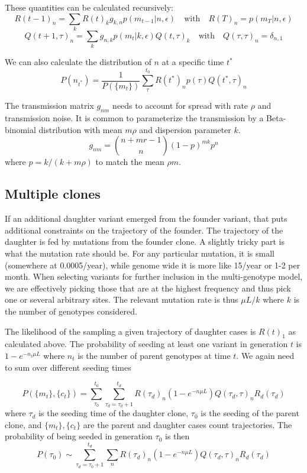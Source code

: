\documentclass[aps,rmp, onecolumn]{revtex4}
\begin{document}
These quantities can be calculated recursively:
\begin{equation}
    R(t-1)_n = \sum_k R(t)_k g_{k,n} p(m_{t-1}|n,\epsilon) \quad \mathrm{with} \quad R(T)_n = p(m_{T}|n,\epsilon)
\end{equation}
\begin{equation}
    Q(t+1,\tau)_n = \sum_k g_{n,k} p(m_t|k,\epsilon) Q(t,\tau)_k  \quad \mathrm{with} \quad Q(\tau,\tau)_n = \delta_{n,1}
\end{equation}


We can also calculate the distribution of $n$ at a specific time $t^*$
\begin{equation}
    P(n_{t^*}) = \frac{1}{P(\{m_t\})}\sum_{\tau}^{t_0} R(t^*)_n p(\tau) Q(t^*,\tau)_n
\end{equation}


The transmission matrix $g_{nm}$ needs to account for spread with rate $\rho$ and transmission noise.
It is common to parameterize the transmission by a Beta-binomial distribution with mean $m\rho$ and dispersion parameter $k$.
\begin{equation}
    g_{nm} = {n + mr - 1 \choose n} (1-p)^{m k} p^n
\end{equation}
where $p=k/(k+m\rho)$ to match the mean $\rho m$.


\subsection*{Multiple clones}
If an additional daughter variant emerged from the founder variant, that puts additional constraints on the trajectory of the founder.
The trajectory of the daughter is fed by mutations from the founder clone.
A slightly tricky part is what the mutation rate should be.
For any particular mutation, it is small (somewhere at 0.0005/year), while genome wide it is more like 15/year or 1-2 per month.
When selecting variants for further inclusion in the multi-genotype model, we are effectively picking those that are at the highest frequency and thus pick one or several arbitrary sites.
The relevant mutation rate is thus $\mu L/k$ where $k$ is the number of genotypes considered.

The likelihood of the sampling a given trajectory of daughter cases is $R(t)_1$ as calculated above.
The probability of seeding at least one variant in generation $t$ is $1-e^{-n_t\mu L}$ where $n_t$ is the number of parent genotypes at time $t$.
We again need to sum over different seeding times

\begin{equation}
    P(\{m_t\}, \{c_t\}) = \sum_{\tau_0}^{t_0}\sum_{\tau_d=\tau_0+1}^{t_d} R(\tau_d)_n (1-e^{-n\mu L}) Q(\tau_d,\tau)_n R_d(\tau_d)
\end{equation}
where $\tau_d$ is the seeding time of the daughter clone, $\tau_0$ is the seeding of the parent clone, and $\{m_t\}, \{c_t\}$ are the parent and daughter cases count trajectories.
The probability of being seeded in generation $\tau_0$ is then
\begin{equation}
    P(\tau_0) \sim \sum_{\tau_d=\tau_0+1}^{t_d} \sum_n R(\tau_d)_n (1-e^{-n\mu L}) Q(\tau_d,\tau)_n R_d(\tau_d)
\end{equation}
\end{document}
